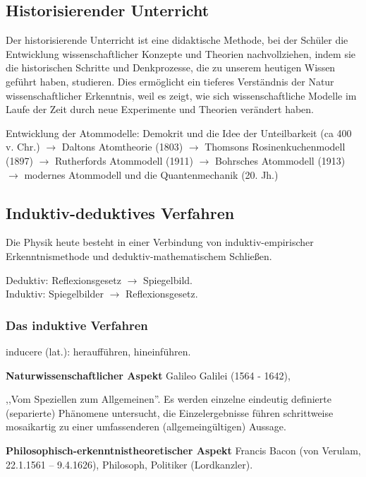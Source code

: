\bip\bip
\subsection{Historisierender Unterricht}

Der historisierende Unterricht ist eine didaktische Methode, bei der Sch\"{u}ler
die Entwicklung wissenschaftlicher Konzepte und Theorien nachvollziehen, indem sie die historischen Schritte und Denkprozesse, die zu unserem heutigen Wissen gef\"{u}hrt haben, studieren. Dies erm\"{o}glicht ein tieferes Verständnis der Natur wissenschaftlicher Erkenntnis, weil es zeigt, wie sich wissenschaftliche Modelle im Laufe der Zeit durch neue Experimente und Theorien verändert haben.
\mip
\begin{beisp}
	Entwicklung der Atommodelle: Demokrit und die Idee der Unteilbarkeit (ca 400 v. Chr.) $\to$ Daltons Atomtheorie (1803) $\to$ Thomsons {\glqq}Rosinenkuchenmodell{\grqq} (1897) $\to$ Rutherfords Atommodell (1911) $\to$ Bohrsches Atommodell (1913) $\to$ modernes Atommodell und die Quantenmechanik (20. Jh.)
\end{beisp}

\bip\bip
\subsection{Induktiv-deduktives Verfahren}
Die Physik heute besteht in einer Verbindung von
induktiv-empirischer Erkenntnismethode und
deduktiv-mathematischem Schlie{\ss}en.

\begin{beisp}
	Deduktiv:  Reflexionsgesetz  $\to$ Spiegelbild. \\
Induktiv: Spiegelbilder $\to$ Reflexionsgesetz.
\end{beisp}

\subsubsection{Das induktive Verfahren}

inducere (lat.): herauff\"{u}hren, hineinf\"{u}hren.

\mip
{\bf Naturwissenschaftlicher Aspekt} Galileo Galilei  (1564 - 1642),

,,Vom Speziellen zum Allgemeinen''.
Es werden einzelne eindeutig definierte (separierte) Ph\"{a}nomene
untersucht, die Einzelergebnisse f\"{u}hren schrittweise
mosaikartig zu einer umfassenderen (allgemeing\"{u}ltigen) Aussage.


\bip
{\bf Philosophisch-erkenntnistheoretischer Aspekt}
Francis Bacon (von Verulam, 22.1.1561 -- 9.4.1626),
Philosoph, Politiker (Lordkanzler).

